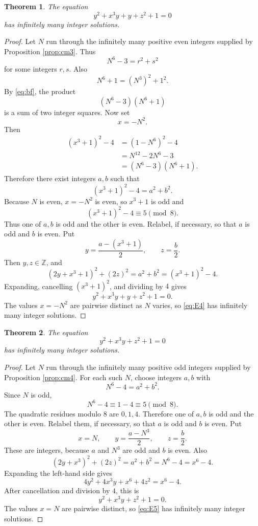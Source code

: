 \documentclass{article}
\theoremstyle{plain}
\theoremstyle{remark}
\theoremstyle{myconjecture}
\theoremstyle{plain}
\newtheorem{theorem}{Theorem}[section]
\theoremstyle{definition}
\numberwithin{equation}{section} %
\begin{document}
\begin{theorem}\label{thm:fourth}
The equation
\[
        y^2+x^3y+y+z^2+1=0                  \tag{E4}\label{eq:E4}
\]
has infinitely many integer solutions.
\end{theorem}

\begin{proof}
Let \(N\) run through the infinitely many positive even integers supplied by
Proposition \ref{prop:cm3}.  Thus
\[
        N^6-3=r^2+s^2
\]
for some integers \(r,s\).  Also
\[
        N^6+1=(N^3)^2+1^2.
\]
By \eqref{eq:bf}, the product
\[
        (N^6-3)(N^6+1)
\]
is a sum of two integer squares.  Now set
\[
        x=-N^2.
\]
Then
\[
\begin{aligned}
        (x^3+1)^2-4
        &=(1-N^6)^2-4 \\
        &=N^{12}-2N^6-3 \\
        &=(N^6-3)(N^6+1).
\end{aligned}
\]
Therefore there exist integers \(a,b\) such that
\[
        (x^3+1)^2-4=a^2+b^2.
\]
Because \(N\) is even, \(x=-N^2\) is even, so \(x^3+1\) is odd and
\[
        (x^3+1)^2-4\equiv5\pmod8.
\]
Thus one of \(a,b\) is odd and the other is even.  Relabel, if necessary, so
that \(a\) is odd and \(b\) is even.  Put
\[
        y=\frac{a-(x^3+1)}{2},
        \qquad
        z=\frac b2.
\]
Then \(y,z\in\mathbb Z\), and
\[
        (2y+x^3+1)^2+(2z)^2=a^2+b^2=(x^3+1)^2-4.
\]
Expanding, cancelling \((x^3+1)^2\), and dividing by \(4\) gives
\[
        y^2+x^3y+y+z^2+1=0.
\]
The values \(x=-N^2\) are pairwise distinct as \(N\) varies, so \eqref{eq:E4}
has infinitely many integer solutions.
\end{proof}

\begin{theorem}\label{thm:fifth}
The equation
\[
        y^2+x^3y+z^2+1=0                    \tag{E5}\label{eq:E5}
\]
has infinitely many integer solutions.
\end{theorem}

\begin{proof}
Let \(N\) run through the infinitely many positive odd integers supplied by
Proposition \ref{prop:cm4}.  For each such \(N\), choose integers \(a,b\) with
\[
        N^6-4=a^2+b^2.
\]
Since \(N\) is odd,
\[
        N^6-4\equiv 1-4\equiv5\pmod8.
\]
The quadratic residues modulo \(8\) are \(0,1,4\).  Therefore one of \(a,b\) is
odd and the other is even.  Relabel them, if necessary, so that \(a\) is odd
and \(b\) is even.  Put
\[
        x=N,
        \qquad
        y=\frac{a-N^3}{2},
        \qquad
        z=\frac b2.
\]
These are integers, because \(a\) and \(N^3\) are odd and \(b\) is even.  Also
\[
        (2y+x^3)^2+(2z)^2=a^2+b^2=N^6-4=x^6-4.
\]
Expanding the left-hand side gives
\[
        4y^2+4x^3y+x^6+4z^2=x^6-4.
\]
After cancellation and division by \(4\), this is
\[
        y^2+x^3y+z^2+1=0.
\]
The values \(x=N\) are pairwise distinct, so \eqref{eq:E5} has infinitely many
integer solutions.
\end{proof}
\end{document}
